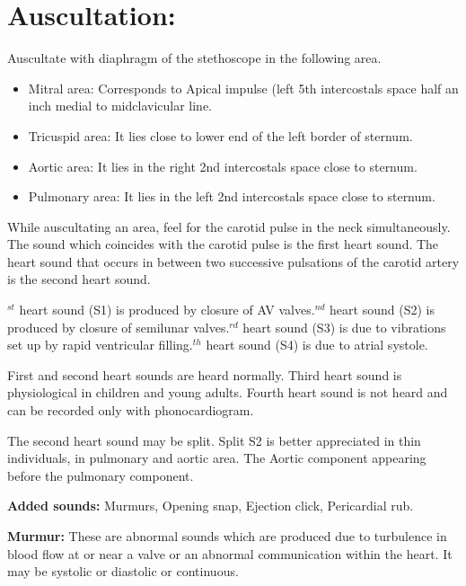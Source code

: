 \documentclass[a4paper,12pt,openany,twoside]{book}
\begin{document}
\section*{Auscultation:}
Auscultate with diaphragm of the stethoscope in the following area. 
\begin{itemize}
\item[]Mitral area: Corresponds to Apical impulse (left 5th intercostals space half an inch medial to midclavicular line.
\item[]Tricuspid area: It lies close to lower end of the left border of sternum.
\item[]Aortic area: It lies in the right 2nd intercostals space close to sternum.
\item[]Pulmonary area: It lies in the left 2nd intercostals space close to sternum.
\end{itemize}
\par
While auscultating an area, feel for the carotid pulse in the neck simultaneously. The sound which coincides with the carotid pulse is the first heart sound. The heart sound that occurs in between two successive pulsations of the carotid artery is the second heart sound.
\par
{}$^{st}$ heart sound (S1) is produced by closure of AV valves.$^{nd}$ heart sound (S2) is produced by closure of semilunar valves.$^{rd}$ heart sound (S3) is due to vibrations set up by rapid ventricular filling.$^{th}$ heart sound (S4) is due to atrial systole.\newline
\par
First and second heart sounds are heard normally. Third heart sound is physiological in children and young adults. Fourth heart sound is not heard and can be recorded only with phonocardiogram.
\par
The second heart sound may be split. Split S2 is better appreciated in thin individuals, in pulmonary and aortic area. The Aortic component appearing before the pulmonary component.
\par
\textbf{Added sounds:} Murmurs, Opening snap, Ejection click, Pericardial rub.
\par
\textbf{Murmur:} These are abnormal sounds which are produced due to turbulence in blood flow at or near a valve or an abnormal communication within the heart. It may be systolic or diastolic or continuous.
\end{document}
